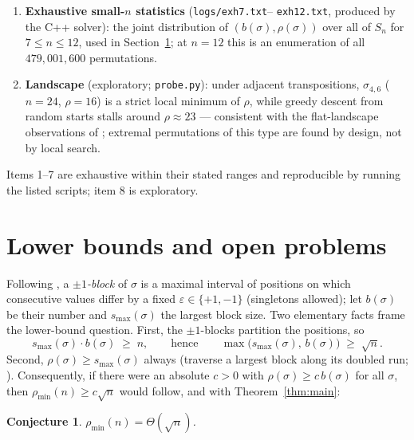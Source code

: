 \documentclass[11pt]{article}
\newtheorem{conjecture}[theorem]{Conjecture}
\theoremstyle{definition}
\newcommand{\pmin}{\rho_{\min}}
\begin{document}
\begin{enumerate}
Every exact value equals $2a + 2b - 4$ and sits inside the proven window
$[2a{+}2b{-}7,\ 4a{+}2b]$ of \eqref{eq:twosided}; the two rows at $n = 480$
(differing in $\rho$) illustrate that $\rho(\sigma_{a,b})$ tracks $a$ and $b$
separately, not merely their product. At $n = 720$ the ratio $0.150$ is far below
the smallest ratio previously conjectured to be asymptotically attainable,
$10/28 \approx 0.357$ \cite{Liz26}.
\item \textbf{Exhaustive small-$n$ statistics} (\texttt{logs/exh7.txt}--%
\texttt{exh12.txt}, produced by the C++ solver): the joint distribution of
$(b(\sigma), \rho(\sigma))$ over all of $S_n$ for $7 \le n \le 12$, used in
Section~\ref{sec:disc}; at $n = 12$ this is an enumeration of all
$479{,}001{,}600$ permutations.
\item \textbf{Landscape} (exploratory; \texttt{probe.py}): under adjacent
transpositions, $\sigma_{4,6}$ ($n = 24$, $\rho = 16$) is a strict local minimum of
$\rho$, while greedy descent from random starts stalls around $\rho \approx 23$ ---
consistent with the flat-landscape observations of \cite{Liz26}; extremal
permutations of this type are found by design, not by local search.
\end{enumerate}

Items 1--7 are exhaustive within their stated ranges and reproducible by running
the listed scripts; item 8 is exploratory.

\section{Lower bounds and open problems}\label{sec:disc}

Following \cite{Liz26}, a \emph{$\pm1$-block} of $\sigma$ is a maximal interval of
positions on which consecutive values differ by a fixed
$\varepsilon \in \{+1,-1\}$ (singletons allowed); let $b(\sigma)$ be their number
and $s_{\max}(\sigma)$ the largest block size. Two elementary facts frame the
lower-bound question. First, the $\pm1$-blocks partition the positions, so
\[
s_{\max}(\sigma) \cdot b(\sigma) \;\ge\; n,
\qquad\text{hence}\qquad
\max\bigl(s_{\max}(\sigma),\, b(\sigma)\bigr) \;\ge\; \sqrt n .
\]
Second, $\rho(\sigma) \ge s_{\max}(\sigma)$ always (traverse a largest block along
its doubled run; \cite{Liz26}). Consequently, if there were an absolute $c > 0$
with $\rho(\sigma) \ge c\, b(\sigma)$ for all $\sigma$, then
$\pmin(n) \ge c\sqrt n$ would follow, and with Theorem~\ref{thm:main}:

\begin{conjecture}\label{conj:sqrt}
$\pmin(n) = \Theta(\sqrt n)$.
\end{conjecture}
\end{document}
